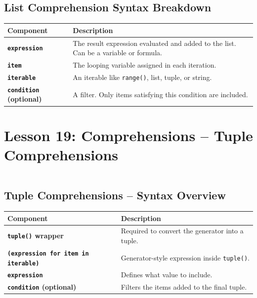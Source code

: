 \documentclass[a4paper,11pt]{article}
\begin{document}
\vspace{1em}
\subsection*{List Comprehension Syntax Breakdown}

\renewcommand{\arraystretch}{1.6}
\begin{tabular}{>{\bfseries}p{3.8cm} p{9.2cm}}
	\toprule
	Component & Description \\
	\midrule
	
	\texttt{expression} & The result expression evaluated and added to the list. Can be a variable or formula. \\
	\texttt{item}       & The looping variable assigned in each iteration. \\
	\texttt{iterable}   & An iterable like \texttt{range()}, list, tuple, or string. \\
	\texttt{condition} (optional) & A filter. Only items satisfying this condition are included. \\
	
	\bottomrule
\end{tabular}


	\section{Lesson 19: Comprehensions – Tuple Comprehensions}
	\inputminted{python}{Python_Files/comprehensions_tuple_guid.py}
	
	\vspace{1em}
	\subsection*{Tuple Comprehensions – Syntax Overview}
	
	\renewcommand{\arraystretch}{1.6}
	\begin{tabular}{>{\bfseries}p{3.8cm} p{9.2cm}}
		\toprule
		Component & Description \\
		\midrule
		
		\texttt{tuple()} wrapper & Required to convert the generator into a tuple. \\
		\texttt{(expression for item in iterable)} & Generator-style expression inside \texttt{tuple()}. \\
		\texttt{expression} & Defines what value to include. \\
		\texttt{condition} (optional) & Filters the items added to the final tuple. \\
		
		\bottomrule
	\end{tabular}
	
\end{document}
